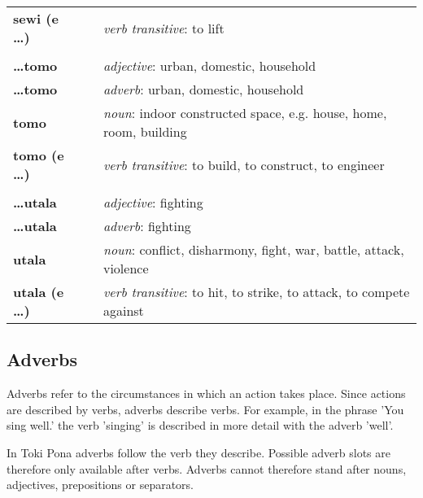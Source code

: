 \begin{supertabular}{p{2,5cm}|ll}
    \textbf{sewi (e \dots)}  &  & \textit{verb transitive}: to lift                                              \\
                             &  &                                                                                \\
    \textbf{\dots tomo}      &  & \textit{adjective}: urban, domestic, household                                 \\
    \textbf{\dots tomo}      &  & \textit{adverb}: urban, domestic, household                                    \\
    \textbf{tomo}            &  & \textit{noun}: indoor constructed space, e.g. house, home, room, building      \\
    \textbf{tomo (e \dots)}  &  & \textit{verb transitive}: to build, to construct, to engineer                  \\
                             &  &                                                                                \\
    \textbf{\dots utala}     &  & \textit{adjective}: fighting                                                   \\
    \textbf{\dots utala}     &  & \textit{adverb}: fighting                                                      \\
    \textbf{utala}           &  & \textit{noun}: conflict, disharmony, fight, war, battle, attack, violence      \\
    \textbf{utala (e \dots)} &  & \textit{verb transitive}: to hit, to strike, to attack, to compete against     \\
\end{supertabular}

\newpage

\subsection*{Adverbs}

Adverbs refer to the circumstances in which an action takes place.
Since actions are described by verbs, adverbs describe verbs.
For example, in the phrase 'You sing well.' the verb 'singing' is described in more detail with the adverb 'well'.

In Toki Pona adverbs follow the verb they describe.
Possible adverb slots are therefore only available after verbs.
Adverbs cannot therefore stand after nouns, adjectives, prepositions or separators.

